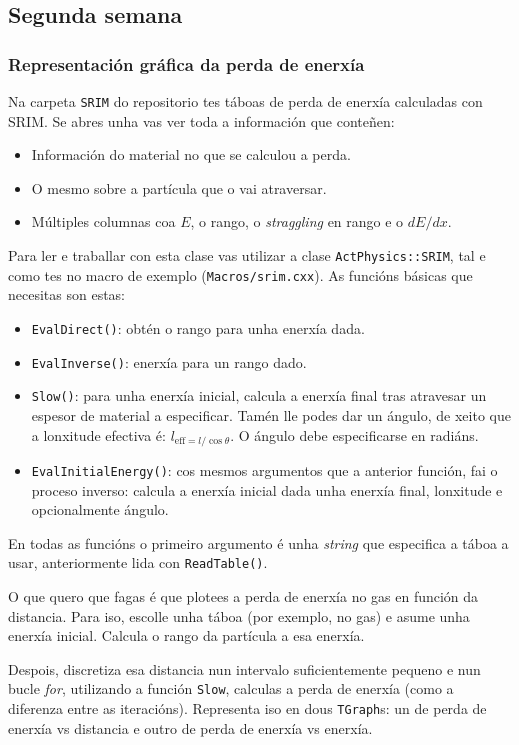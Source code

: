 \documentclass[11pt, a4paper]{article}
\newcommand{\iso}[2]{\ce{^{#1}#2}}
\begin{document}
\subsection{Segunda semana}
\subsubsection*{Representación gráfica da perda de enerxía}
Na carpeta \lstinline|SRIM| do repositorio tes táboas de perda de enerxía calculadas con SRIM. Se abres unha vas ver toda a información que conteñen:
\begin{itemize}
    \item Información do material no que se calculou a perda.
    \item O mesmo sobre a partícula que o vai atraversar.
    \item Múltiples columnas coa $E$, o rango, o \textit{straggling} en rango e o $dE/dx$.
\end{itemize}
Para ler e traballar con esta clase vas utilizar a clase \lstinline|ActPhysics::SRIM|, tal e como tes no macro de exemplo (\lstinline|Macros/srim.cxx|). As funcións básicas que necesitas son estas:
\begin{itemize}
    \item \lstinline|EvalDirect()|: obtén o rango para unha enerxía dada.
    \item \lstinline|EvalInverse()|: enerxía para un rango dado.
    \item \lstinline|Slow()|: para unha enerxía inicial, calcula a enerxía final tras atravesar un espesor de material a especificar. Tamén lle podes dar un ángulo, de xeito que a lonxitude efectiva é: $l_{\text{eff} = l / \cos{\theta}}$. O ángulo debe especificarse en radiáns.
    \item \lstinline|EvalInitialEnergy()|: cos mesmos argumentos que a anterior función, fai o proceso inverso: calcula a enerxía inicial dada unha enerxía final, lonxitude e opcionalmente ángulo.
\end{itemize}
En todas as funcións o primeiro argumento é unha \textit{string} que especifica a táboa a usar, anteriormente lida con \lstinline|ReadTable()|.

O que quero que fagas é que plotees a perda de enerxía no gas en función da distancia. Para iso, escolle unha táboa (por exemplo, \iso{11}{Li} no gas) e asume unha enerxía inicial. Calcula o rango da partícula a esa enerxía.

Despois, discretiza esa distancia nun intervalo suficientemente pequeno e nun bucle \textit{for}, utilizando a función \lstinline|Slow|, calculas a perda de enerxía (como a diferenza entre as iteracións). Representa iso en dous  \lstinline|TGraph|s: un de perda de enerxía vs distancia e outro de perda de enerxía vs enerxía.
\end{document}
